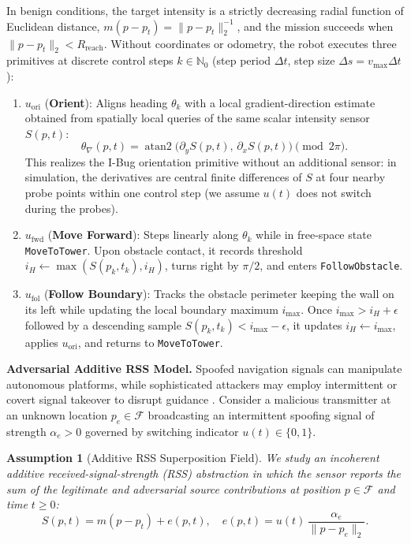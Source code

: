 \documentclass[10pt, a4paper, twocolumn]{article}
\newtheorem{assumption}{Assumption}
\begin{document}
In benign conditions, the target intensity is a strictly decreasing radial function of Euclidean distance, $m(p - p_t) = \|p - p_t\|_2^{-1}$, and the mission succeeds when $\|p - p_t\|_2 < R_{\text{reach}}$. Without coordinates or odometry, the robot executes three primitives at discrete control steps $k \in \mathbb{N}_0$ (step period $\Delta t$, step size $\Delta s = v_{\max}\Delta t$):
\begin{enumerate}
    \item $u_{\text{ori}}$ (\textbf{Orient}): Aligns heading $\theta_k$ with a local gradient-direction estimate obtained from spatially local queries of the same scalar intensity sensor $S(p, t)$:
    \begin{equation}
        \theta_{\nabla}(p, t) = \operatorname{atan2}\!\bigl(\partial_y S(p, t),\, \partial_x S(p, t)\bigr) \pmod{2\pi}.
        \label{eq:grad_angle}
    \end{equation}
    This realizes the I-Bug orientation primitive without an additional sensor: in simulation, the derivatives are central finite differences of $S$ at four nearby probe points within one control step (we assume $u(t)$ does not switch during the probes).
    \item $u_{\text{fwd}}$ (\textbf{Move Forward}): Steps linearly along $\theta_k$ while in free-space state \texttt{MoveToTower}. Upon obstacle contact, it records threshold $i_H \leftarrow \max(S(p_k, t_k), i_H)$, turns right by $\pi/2$, and enters \texttt{FollowObstacle}.
    \item $u_{\text{fol}}$ (\textbf{Follow Boundary}): Tracks the obstacle perimeter keeping the wall on its left while updating the local boundary maximum $i_{\text{max}}$. Once $i_{\text{max}} > i_H + \epsilon$ followed by a descending sample $S(p_k, t_k) < i_{\text{max}} - \epsilon$, it updates $i_H \leftarrow i_{\text{max}}$, applies $u_{\text{ori}}$, and returns to \texttt{MoveToTower}.
\end{enumerate}

\noindent\textbf{Adversarial Additive RSS Model.}
Spoofed navigation signals can manipulate autonomous platforms, while sophisticated attackers may employ intermittent or covert signal takeover to disrupt guidance \cite{kerns2014unmanned, psiaki2016gnss}. Consider a malicious transmitter at an unknown location $p_e \in \mathcal{F}$ broadcasting an intermittent spoofing signal of strength $\alpha_e > 0$ governed by switching indicator $u(t) \in \{0, 1\}$.

\begin{assumption}[Additive RSS Superposition Field]
\label{assump:superposition}
We study an incoherent additive received-signal-strength (RSS) abstraction in which the sensor reports the sum of the legitimate and adversarial source contributions at position $p \in \mathcal{F}$ and time $t \ge 0$:
\begin{equation}
    S(p, t) = m(p - p_t) + e(p, t), \quad e(p, t) = u(t)\,\frac{\alpha_e}{\|p - p_e\|_2}.
    \label{eq:superposition}
\end{equation}
\end{assumption}
\end{document}
